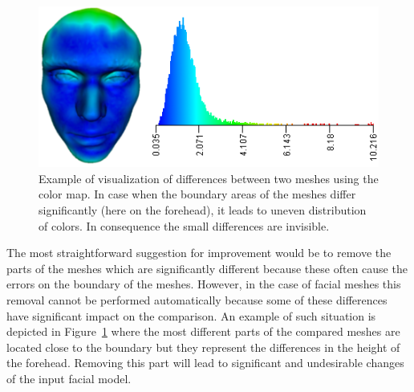 \documentclass[final,5p,times]{elsarticle}
\begin{document}
\begin{figure}[htb]
	\centering
  \includegraphics[width=1\linewidth]{pictures/colormap.png}
  \caption{\label{fig:colormap} Example of visualization of differences between two meshes using the color map. In case when the boundary areas of the meshes differ significantly (here on the forehead), it leads to uneven distribution of colors. In consequence the small differences are invisible.}
\end{figure}

The most straightforward suggestion for improvement would be to remove the parts of the meshes which are significantly different because these often cause the errors on the boundary of the meshes.
However, in the case of facial meshes this removal cannot be performed automatically because some of these differences have significant impact on the comparison.
An example of such situation is depicted in Figure~\ref{fig:colormap} where the most different parts of the compared meshes are located close to the boundary but they represent the differences in the height of the forehead.
Removing this part will lead to significant and undesirable changes of the input facial model.
\end{document}
